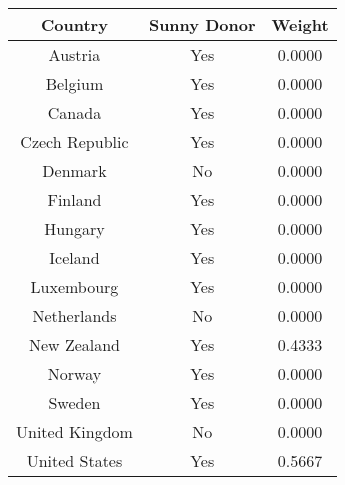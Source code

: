 \begin{tabular}{c|c|c}
\textbf{Country}&\textbf{Sunny Donor}&\textbf{Weight}\\
\hline 
Austria & Yes & 0.0000 \\ 
Belgium & Yes & 0.0000 \\ 
Canada & Yes & 0.0000 \\ 
Czech Republic & Yes & 0.0000 \\ 
Denmark & No & 0.0000 \\ 
Finland & Yes & 0.0000 \\ 
Hungary & Yes & 0.0000 \\ 
Iceland & Yes & 0.0000 \\ 
Luxembourg & Yes & 0.0000 \\ 
Netherlands & No & 0.0000 \\ 
New Zealand & Yes & 0.4333 \\ 
Norway & Yes & 0.0000 \\ 
Sweden & Yes & 0.0000 \\ 
United Kingdom & No & 0.0000 \\ 
United States & Yes & 0.5667 \\ 
\end{tabular}